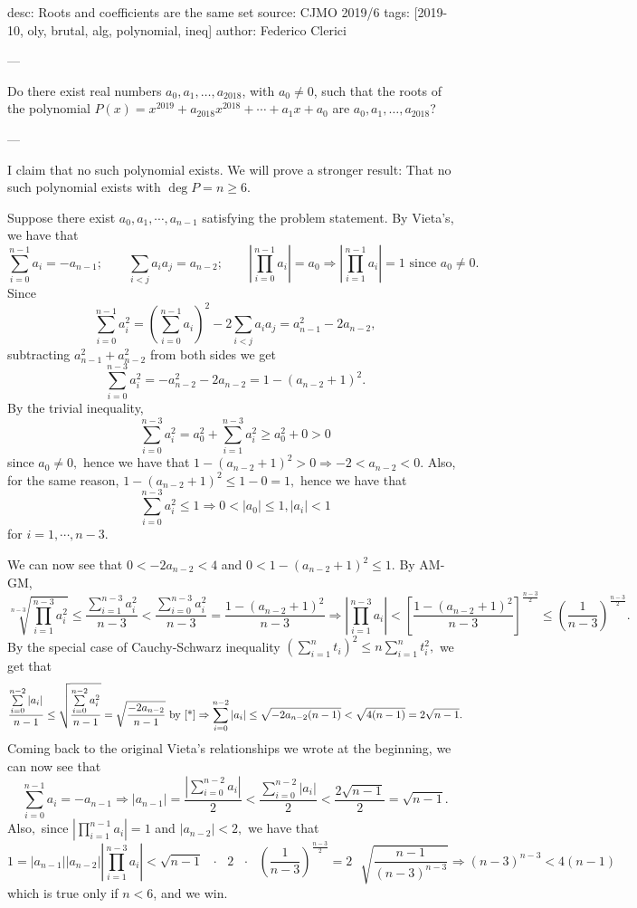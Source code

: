 desc: Roots and coefficients are the same set
source: CJMO 2019/6
tags: [2019-10, oly, brutal, alg, polynomial, ineq]
author: Federico Clerici

---

Do there exist real numbers $a_0,a_1,\ldots,a_{2018}$, with $a_0\ne 0$, such that the roots of the polynomial $P(x)=x^{2019}+a_{2018}x^{2018}+\cdots+a_1x+a_0$ are $a_0,a_1,\ldots,a_{2018}$?

---

I claim that no such polynomial exists. We will prove a stronger result: That no such polynomial exists with $\deg P=n\ge 6$.

Suppose there exist $a_0,a_1,\cdots,a_{n-1}$ satisfying the problem statement. By Vieta's, we have that \[\sum_{i=0}^{n-1}a_i=-a_{n-1};\qquad\sum_{i<j}a_ia_j=a_{n-2};\qquad\left|\prod\limits_{i=0}^{n-1} a_i\right| =a_0\Rightarrow \left|\prod_{i=1}^{n-1} a_i\right|=1 \text{ since }a_0\neq 0.\]
Since
\begin{equation}\label{*}
    \sum\limits_{i=0}^{n-1}a_i^2=\left(\sum\limits_{i=0}^{n-1}a_i\right)^2-2\sum\limits_{i<j}a_ia_j=a_{n-1}^2-2a_{n-2},\tag{$\star$}
\end{equation}
subtracting $a_{n-1}^2+a_{n-2}^2$ from both sides we get \[\sum\limits_{i=0}^{n-3}a_i^2=-a_{n-2}^2-2a_{n-2}=1-(a_{n-2}+1)^2.\]
By the trivial inequality, \[\sum\limits_{i=0}^{n-3}a_i^2=a_0^2+\sum\limits_{i=1}^{n-3}a_i^2\geq a_0^2+0>0\] since $a_0\neq 0,$ hence we have that $1-(a_{n-2}+1)^2>0 \Rightarrow -2<a_{n-2}<0.$ Also, for the same reason, $1-(a_{n-2}+1)^2\leq 1-0=1,$ hence we have that \[\sum\limits_{i=0}^{n-3}a_i^2\leq 1\Rightarrow 0<|a_0|\leq 1, |a_i|<1\] for $i=1,\cdots, n-3.$

We can now see that $0<-2a_{n-2}<4$ and $0<1-(a_{n-2}+1)^2\leq 1.$ By AM-GM, \small{\[\sqrt[n-3]{\prod\limits_{i=1}^{n-3}a_i^2}\leq \frac{\sum\limits_{i=1}^{n-3}a_i^2}{n-3}<\frac{\sum\limits_{i=0}^{n-3}a_i^2}{n-3}=\frac{1-(a_{n-2}+1)^2}{n-3}\Rightarrow \left|\prod\limits_{i=1}^{n-3} a_i\right|<\left[\frac{1-(a_{n-2}+1)^2}{n-3}\right]^{\frac{n-3}{2}}\leq \left(\frac{1}{n-3}\right)^{\frac{n-3}{2}}.\]}
By the special case of Cauchy-Schwarz inequality $\left(\sum\limits_{i=1}^n t_i\right)^2\leq n \sum\limits_{i=1}^n t_i^2,$ we get that \small{\[\frac{\sum\limits_{i=0}^{n-2}|a_i|}{n-1}\leq \sqrt{\frac{\sum\limits_{i=0}^{n-2}a_i^2}{n-1}}=\sqrt{\frac{-2a_{n-2}}{n-1}} \text { by \eqref{*}} \Rightarrow \sum\limits_{i=0}^{n-2}|a_i|\leq \sqrt{-2a_{n-2}(n-1)}<\sqrt{4(n-1)}=2\sqrt{n-1}.\]}
Coming back to the original Vieta's relationships we wrote at the beginning, we can now see that \[\sum\limits_{i=0}^{n-1}a_i=-a_{n-1} \Rightarrow |a_{n-1}|=\frac{\left|\sum\limits_{i=0}^{n-2}a_i\right|}{2}<\frac{\sum\limits_{i=0}^{n-2}|a_i|}{2}<\frac{2\sqrt{n-1}}{2}=\sqrt{n-1}.\]Also$,$ since $\left|\prod\limits_{i=1}^{n-1} a_i\right|=1$ and $|a_{n-2}|<2,$ we have that \small{\[1=|a_{n-1}||a_{n-2}|\left|\prod\limits_{i=1}^{n-3} a_i\right|<
\sqrt{n-1}\text{ } \cdot \text{ }2\text{ }\cdot\text{ } \left(\frac{1}{n-3}\right)^{\frac{n-3}{2}}=2\text{ }\sqrt{\frac{n-1}{(n-3)^{n-3}}}\Rightarrow (n-3)^{n-3}<4(n-1)\]}
which is true only if $n<6$, and we win.
